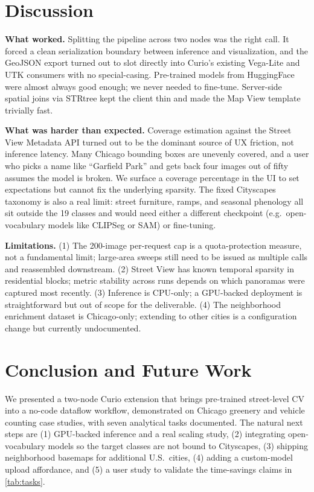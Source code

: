 \documentclass[journal]{vgtc}                     %
\begin{document}
\section{Discussion}
\label{sec:discussion}

\textbf{What worked.} Splitting the pipeline across two nodes was the right call. It forced a clean serialization boundary between inference and visualization, and the GeoJSON export turned out to slot directly into Curio's existing Vega-Lite and UTK consumers with no special-casing. Pre-trained models from HuggingFace were almost always good enough; we never needed to fine-tune. Server-side spatial joins via STRtree kept the client thin and made the Map View template trivially fast.

\textbf{What was harder than expected.} Coverage estimation against the Street View Metadata API turned out to be the dominant source of UX friction, not inference latency. Many Chicago bounding boxes are unevenly covered, and a user who picks a name like ``Garfield Park'' and gets back four images out of fifty assumes the model is broken. We surface a coverage percentage in the UI to set expectations but cannot fix the underlying sparsity. The fixed Cityscapes taxonomy is also a real limit: street furniture, ramps, and seasonal phenology all sit outside the 19 classes and would need either a different checkpoint (e.g.\ open-vocabulary models like CLIPSeg or SAM) or fine-tuning.

\textbf{Limitations.} (1) The 200-image per-request cap is a quota-protection measure, not a fundamental limit; large-area sweeps still need to be issued as multiple calls and reassembled downstream. (2) Street View has known temporal sparsity in residential blocks; metric stability across runs depends on which panoramas were captured most recently. (3) Inference is CPU-only; a GPU-backed deployment is straightforward but out of scope for the deliverable. (4) The neighborhood enrichment dataset is Chicago-only; extending to other cities is a configuration change but currently undocumented.

\section{Conclusion and Future Work}
\label{sec:conclusion}

We presented a two-node Curio extension that brings pre-trained street-level CV into a no-code dataflow workflow, demonstrated on Chicago greenery and vehicle counting case studies, with seven analytical tasks documented. The natural next steps are (1) GPU-backed inference and a real scaling study, (2) integrating open-vocabulary models so the target classes are not bound to Cityscapes, (3) shipping neighborhood basemaps for additional U.S.~cities, (4) adding a custom-model upload affordance, and (5) a user study to validate the time-savings claims in \autoref{tab:tasks}.
\end{document}
